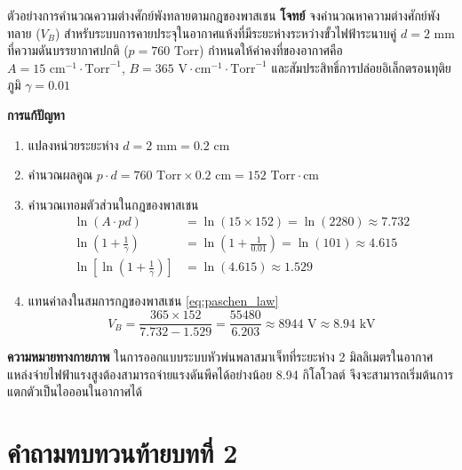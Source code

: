 \begin{examplebox}{ตัวอย่างการคำนวณความต่างศักย์พังทลายตามกฎของพาสเชน}
\textbf{โจทย์} จงคำนวณหาความต่างศักย์พังทลาย ($V_B$) สำหรับระบบการคายประจุในอากาศแห้งที่มีระยะห่างระหว่างขั้วไฟฟ้าระนาบคู่ $d = 2\text{ mm}$ ที่ความดันบรรยากาศปกติ ($p = 760\text{ Torr}$) กำหนดให้ค่าคงที่ของอากาศคือ $A = 15\text{ cm}^{-1}\cdot\text{Torr}^{-1}$, $B = 365\text{ V}\cdot\text{cm}^{-1}\cdot\text{Torr}^{-1}$ และสัมประสิทธิ์การปล่อยอิเล็กตรอนทุติยภูมิ $\gamma = 0.01$

\textbf{การแก้ปัญหา}
\begin{enumerate}
    \item แปลงหน่วยระยะห่าง $d = 2\text{ mm} = 0.2\text{ cm}$
    \item คำนวณผลคูณ $p \cdot d = 760\text{ Torr} \times 0.2\text{ cm} = 152\text{ Torr}\cdot\text{cm}$
    \item คำนวณเทอมตัวส่วนในกฎของพาสเชน
    \begin{align*}
        \ln(A \cdot pd) &= \ln(15 \times 152) = \ln(2280) \approx 7.732 \\
        \ln\left(1 + \frac{1}{\gamma}\right) &= \ln\left(1 + \frac{1}{0.01}\right) = \ln(101) \approx 4.615 \\
        \ln\left[\ln\left(1 + \frac{1}{\gamma}\right)\right] &= \ln(4.615) \approx 1.529
    \end{align*}
    \item แทนค่าลงในสมการกฎของพาสเชน \eqref{eq:paschen_law}
    \begin{equation*}
        V_B = \frac{365 \times 152}{7.732 - 1.529} = \frac{55480}{6.203} \approx 8944\text{ V} \approx 8.94\text{ kV}
    \end{equation*}
\end{enumerate}
\textbf{ความหมายทางกายภาพ} ในการออกแบบระบบหัวพ่นพลาสมาเจ็ทที่ระยะห่าง 2 มิลลิเมตรในอากาศ แหล่งจ่ายไฟฟ้าแรงสูงต้องสามารถจ่ายแรงดันพีคได้อย่างน้อย 8.94 กิโลโวลต์ จึงจะสามารถเริ่มต้นการแตกตัวเป็นไอออนในอากาศได้
\end{examplebox}

\clearpage


\section*{คำถามทบทวนท้ายบทที่ 2}

